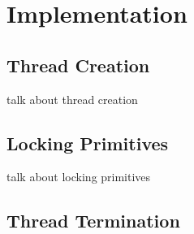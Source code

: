 \chapter{Implementation}\label{ch:implementation}


\section{Thread Creation}\label{sec_threadcreation}
talk about thread creation

\section{Locking Primitives}\label{sec_lockingprimitives}
talk about locking primitives

\section{Thread Termination}\label{sec_threadtermination}
